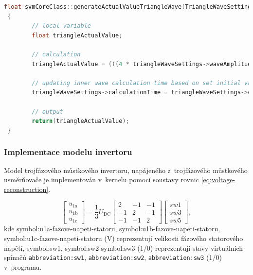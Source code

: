 \documentclass[a4paper, twoside, 11pt]{article}
\begin{document}
			  \begin{lstlisting}[language={c++}, caption={Implementace výpočtu aktuální hodnoty pilovitého průběhu. Představená implementace používá struktury typu TriangleWaveSettingsType. Ve vytvořeném kernelu je místo struktury použito pole typu float.}, label={lst:implementace-vypoctu-triangle-actual-value}]
float svmCoreClass::generateActualValueTriangleWave(TriangleWaveSettingsType *triangleWaveSettings)
 {
        // local variable
        float triangleActualValue;

        // calculation
        triangleActualValue = (((4 * triangleWaveSettings->waveAmplitude)/triangleWaveSettings->wavePeriod) * abs(fmod((fmod((triangleWaveSettings->calculationTime-(triangleWaveSettings->wavePeriod/4)), triangleWaveSettings->wavePeriod) +  triangleWaveSettings->wavePeriod),  triangleWaveSettings->wavePeriod) - ( triangleWaveSettings->wavePeriod/2)) - triangleWaveSettings->waveAmplitude);

        // updating inner wave calculation time based on set initial value of calculationTime
        triangleWaveSettings->calculationTime = triangleWaveSettings->calculationTime + triangleWaveSettings->calculationStep;

        // output
        return(triangleActualValue);
 }\end{lstlisting}

		\subsubsection{Implementace modelu invertoru}
			Model trojfázového můstkového invertoru, napájeného z~trojfázového můstkového usměrňovače je implementován v~kernelu pomocí soustavy rovnic \ref{eq:voltage-reconstruction}. \cite{lipcak-bauer-ept-moodle}

			\begin{equation}
				\begin{bmatrix}
					u_\text{1a}\\
					u_\text{1b}\\
					u_\text{1c}
				\end{bmatrix}
				=
				\frac{1}{3} U_\text{DC}
				\begin{bmatrix}
					2 & -1 & -1\\
					-1 & 2 & -1\\
					-1 & -1 & 2
				\end{bmatrix}
				\begin{bmatrix}
					sw1\\
					sw3\\
					sw5
				\end{bmatrix},
				\label{eq:voltage-reconstruction}
			\end{equation}
			kde \gls{symbol:u1a-fazove-napeti-statoru}, \gls{symbol:u1b-fazove-napeti-statoru}, \gls{symbol:u1c-fazove-napeti-statoru} (V) reprezentují velikosti fázového statorového napětí, \gls{symbol:sw1}, \gls{symbol:sw2} \gls{symbol:sw3} (1/0) reprezentují stavy virtuálních spínačů \texttt{\gls{abbreviation:sw1}}, \texttt{\gls{abbreviation:sw2}}, \texttt{\gls{abbreviation:sw3}} (1/0) v~programu.
\end{document}
